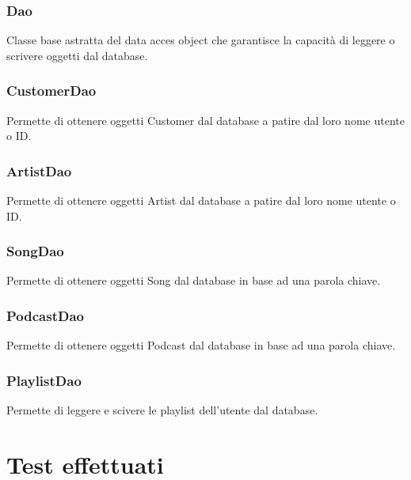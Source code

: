 \documentclass{article}
\begin{document}
\subsubsection{Dao}
Classe base astratta del data acces object che garantisce la capacità di leggere
o scrivere oggetti dal database.
\subsubsection{CustomerDao}
Permette di ottenere oggetti Customer dal database a patire dal loro nome utente o ID.
\subsubsection{ArtistDao}
Permette di ottenere oggetti Artist dal database a patire dal loro nome utente o ID.
\subsubsection{SongDao}
Permette di ottenere oggetti Song dal database in base ad una parola chiave.
\subsubsection{PodcastDao}
Permette di ottenere oggetti Podcast  dal database in base ad una parola chiave.
\subsubsection{PlaylistDao}
Permette di leggere e scivere le playlist dell'utente dal database.
\section{Test effettuati}   
\end{document}
